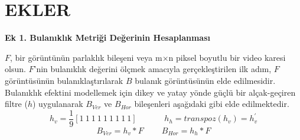 \chapter{EKLER 
	\label{chap:ekler}}


\renewcommand{\thefigure}{\arabic{figure}}
\renewcommand{\figurename}{Ek \c{S}ekil\,}

\renewcommand{\thetable}{\arabic{table}}
\renewcommand{\tablename}{Ek Tablo\,}

\setcounter{defcounter}{0}

\newenvironment{aequation}{%
	\addtocounter{equation}{-1}
	\refstepcounter{defcounter}
	\renewcommand\theequation{E.\thedefcounter}
	\begin{equation}}
{\end{equation}
}

	\textbf{Ek 1. Bulanıklık Metriği Değerinin Hesaplanması}
	
	$F$, bir görüntünün parlaklık bileşeni veya m$\times$n piksel boyutlu bir video karesi olsun. $F$'nin bulanıklık değerini ölçmek amacıyla gerçekleştirilen ilk adım, $F$ görüntüsünün bulanıklaştırılarak $B$ bulanık görüntüsünün elde edilmesidir. Bulanıklık efektini modellemek için dikey ve yatay yönde güçlü bir alçak-geçiren filtre ($h$) uygulanarak $B_{Ver}$ ve $B_{Hor}$ bileşenleri aşağıdaki gibi elde edilmektedir.
	\begin{equation}
	 h_{v}=\frac{1}{9}\left [ 1\: 1\: 1\: 1\: 1\: 1\: 1\: 1\: 1 \right ]  \;\;\;\;\;\;\;\;\;\;\;\; h_{h}=transpoz(h_{v})=h_{v}^{'}
	\end{equation}
	\begin{equation}
	    B_{Ver}=h_{v}*F \;\;\;\;\;\;\;\; B_{Hor}=h_{h}*F
	\end{equation}
	
